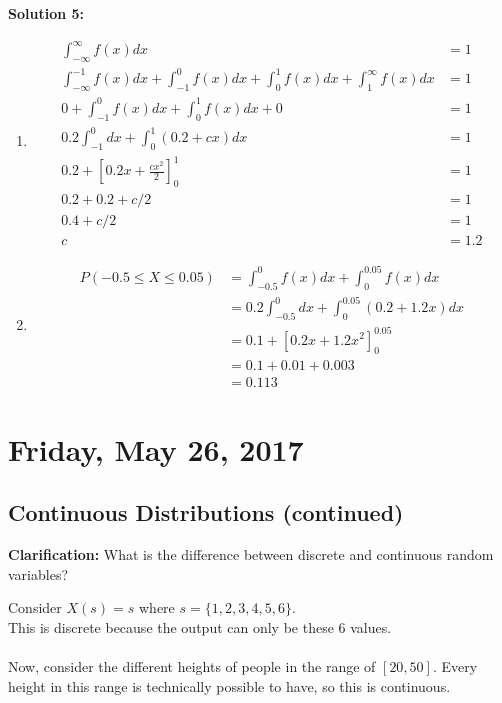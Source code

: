 \documentclass[12pt]{article}
\begin{document}
\textbf{Solution 5:}
\begin{enumerate}
	\item{
	\begin{align*}
		\int_{-\infty}^{\infty} f(x) dx &= 1\\
		\int_{-\infty}^{-1} f(x) dx + \int_{-1}^{0} f(x) dx + \int_{0}^{1} f(x) dx + \int_{1}^{\infty} f(x) dx &= 1\\
		0 + \int_{-1}^{0} f(x) dx + \int_{0}^{1} f(x) dx + 0 &= 1\\
		0.2\int_{-1}^{0} dx + \int_{0}^{1} (0.2+cx) dx &= 1\\
		0.2 + [0.2x + \frac{cx^2}{2}]^{1}_{0} &= 1\\
		0.2 + 0.2 + c/2 &=1 \\
		0.4 + c/2 &= 1\\
		c &= 1.2
	\end{align*}
	}
	\item{
	\begin{align*}
		P(-0.5 \leq X \leq 0.05) &= \int_{-0.5}^{0} f(x) dx + \int_{0}^{0.05} f(x) dx\\
		&= 0.2 \int_{-0.5}^{0} dx + \int_{0}^{0.05} (0.2 + 1.2x) dx\\
		&= 0.1 + [0.2x + 1.2x^2]^{0.05}_{0}\\
		&= 0.1 + 0.01 + 0.003\\
		&= 0.113
	\end{align*}
	}
\end{enumerate}

\newpage

\section{Friday, May 26, 2017}

\subsection{Continuous Distributions (continued)}

\textbf{Clarification: } What is the difference between discrete and continuous random variables?

Consider $X(s) = s$ where $s = \{1,2,3,4,5,6 \}$.\\
This is discrete because the output can only be these 6 values.\\
\\
Now, consider the different heights of people in the range of $[20,50]$. Every height in this range is technically possible to have, so this is continuous.
\end{document}
